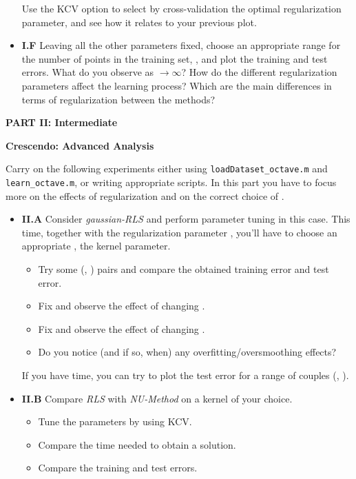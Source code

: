 \documentclass[DIN, pagenumber=false, fontsize=11pt, parskip=half]{scrartcl}
\newcommand{\mysection}[1]{\noindent\large\textbf{#1}}
\begin{document}
\begin{itemize}
	Use the KCV option to select by cross-validation the optimal regularization parameter, and see how it relates to your previous plot.
	
	\item \textbf{I.F} Leaving all the other parameters fixed, choose an appropriate range for the number of points in the training set, \mcode{nval=[n\_min:} \mcode{n\_step:n\_max]},  and plot the training and test errors.
	 What do you observe as  $\rightarrow \infty$? How do the different regularization parameters affect the learning process? Which are the main differences in terms of regularization between the methods?
\end{itemize}




\begin{center}
\large\textbf{PART II: Intermediate}
\end{center}

\mysection{Crescendo: Advanced Analysis}

Carry on the following experiments either using \texttt{loadDataset\_octave.m} and \texttt{learn\_octave.m}, or writing appropriate scripts.
 In this part you have to focus more on the effects of regularization and on the correct choice of .
 
\begin{itemize}
	\item \textbf{II.A} Consider \emph{gaussian-RLS} and perform parameter tuning in this case. This time, together with the regularization parameter , you'll have to choose an appropriate , the kernel parameter.
\begin{itemize}
  \item Try some (, ) pairs and compare the obtained training error  and test error.
  \item Fix  and observe the effect of changing .
  \item Fix  and observe the effect of changing .
  \item Do you notice (and if so, when) any overfitting/oversmoothing effects?
\end{itemize}
  If you have time, you can try to plot the test error for a range of couples (, ).

	\item \textbf{II.B} Compare \emph{RLS} with \emph{NU-Method} on a kernel of your choice.
\begin{itemize}
  \item Tune the parameters by using KCV.
  \item Compare the time needed to obtain a solution.
  \item Compare the training and test errors.
\end{itemize}
\end{itemize} 
 
\end{document}
